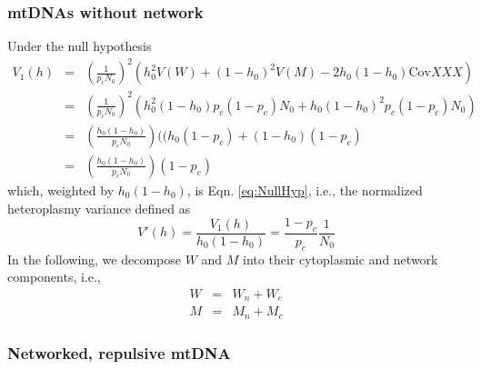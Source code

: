 \documentclass{article}
\begin{document}
\subsubsection*{mtDNAs without network}\label{App:Derivations}
Under the null hypothesis
\begin{eqnarray}
 V_1(h) &= & \left(\frac{1}{p_cN_0}\right)^2(h_0^2V(W)+(1-h_0)^2V(M) -2h_0(1-h_0)\mathrm{Cov} XXX)\\
      &  = & \left(\frac{1}{p_cN_0}\right)^2(h_0^2(1-h_0)p_c(1-p_c)N_0 +h_0(1-h_0)^2p_c(1-p_c)N_0)\\
      &  = & \left(\frac{h_0(1-h_0)}{p_cN_0}\right)((h_0(1-p_c)+(1-h_0)(1-p_c) \\
      &  = & \left(\frac{h_0(1-h_0)}{p_cN_0}\right)(1-p_c)
\end{eqnarray}
which, weighted by $h_0(1-h_0)$, is Eqn. \ref{eq:NullHyp}, i.e., the normalized heteroplasmy variance defined as
\begin{equation}\label{eq:App_NullHyp}
V'(h)=\frac{V_1(h)}{h_0(1-h_0)}=\frac{1-p_c}{p_c}\frac{1}{N_0}
\end{equation}
In the following, we decompose $W$ and $M$ into their cytoplasmic and network components, i.e.,
\begin{eqnarray}
  W &= &W_n + W_c\\
   M &= &M_n + M_c
\end{eqnarray}
\subsubsection*{Networked, repulsive mtDNA}
\end{document}
